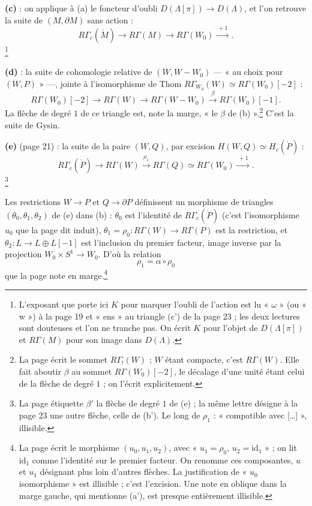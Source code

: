 \documentclass[11pt,a4paper]{article}
\begin{document}
\textbf{(c)} : on applique à (a) le foncteur d'oubli
$D(\Lambda[\pi]) \to D(\Lambda)$, et l'on retrouve la suite de $(M, \partial M)$
sans action :
\[
  R\Gamma_{c}(\mathring{M}) \longrightarrow R\Gamma(M)
  \longrightarrow R\Gamma(W_0) \xrightarrow{\ +1\ } .
\]
\footnote{L'exposant que porte ici $K$ pour marquer l'oubli de l'action est lu
« $\omega$ » (ou « w ») à la page 19 et « ens » au triangle (c') de la page 23 ;
les deux lectures sont douteuses et l'on ne tranche pas. On écrit $K$ pour
l'objet de $D(\Lambda[\pi])$ et $R\Gamma(M)$ pour son image dans
$D(\Lambda)$.}

\textbf{(d)} : la suite de cohomologie relative de $(W, W - W_0)$ — « au choix
pour $(W, P)$ » —, jointe à l'isomorphisme de Thom
$R\Gamma_{W_0}(W) \simeq R\Gamma(W_0)[-2]$ :
\[
  R\Gamma(W_0)[-2] \longrightarrow R\Gamma(W) \longrightarrow R\Gamma(W - W_0)
  \xrightarrow{\ \beta\ } R\Gamma(W_0)[-1] .
\]
La flèche de degré $1$ de ce triangle est, note la marge, « le $\beta$ de
(b) ».\footnote{La page écrit le sommet $R\Gamma_{!}(W)$ ; $W$ étant compacte,
c'est $R\Gamma(W)$. Elle fait aboutir $\beta$ au sommet $R\Gamma(W_0)[-2]$, le
décalage d'une unité étant celui de la flèche de degré $1$ ; on l'écrit
explicitement.} C'est la suite de Gysin.

\textbf{(e)} (page 21) : la suite de la paire $(W, Q)$, par excision
$H(W, Q) \simeq H_{c}(\mathring{P})$ :
\[
  R\Gamma_{c}(\mathring{P}) \longrightarrow R\Gamma(W)
  \xrightarrow{\ \rho_1\ } R\Gamma(Q) \simeq R\Gamma(W_0) \xrightarrow{\ +1\ } .
\]
\footnote{La page étiquette $\beta'$ la flèche de degré $1$ de (e) ; la même
lettre désigne à la page 23 une autre flèche, celle de (b'). Le long de
$\rho_1$ : « compatible avec […] », illisible.}

Les restrictions $W \to P$ et $Q \to \partial P$ définissent un morphisme de
triangles $(\theta_0, \theta_1, \theta_2)$ de (e) dans (b) : $\theta_0$ est
l'identité de $R\Gamma_{c}(\mathring{P})$ (c'est l'isomorphisme $u_0$ que la
page dit induit), $\theta_1 = \rho_0 : R\Gamma(W) \to R\Gamma(P)$ est la
restriction, et $\theta_2 : L \to L \oplus L[-1]$ est l'inclusion du premier
facteur, image inverse par la projection $W_0 \times S^{1} \to W_0$. D'où la
relation
\[
  \rho_1 = \alpha \circ \rho_0
\]
que la page note en marge.\footnote{La page écrit le morphisme
$(u_0, u_1, u_2)$, avec « $u_1 = \rho_0$, $u_2 = \mathrm{id}_1$ » ; on lit
$\mathrm{id}_1$ comme l'identité sur le premier facteur. On renomme ces
composantes, $u$ et $u_1$ désignant plus loin d'autres flèches. La
justification de « $u_0$ isomorphisme » est illisible ; c'est l'excision. Une
note en oblique dans la marge gauche, qui mentionne (a'), est presque
entièrement illisible.}
\end{document}
